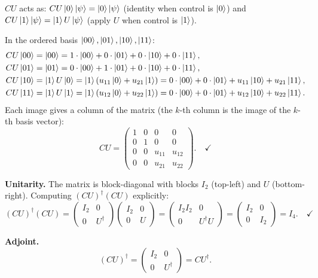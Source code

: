 \documentclass{ceri/sty/rapport}
\begin{document}
\begin{solution}
$CU$ acts as: $CU\ket{0}\ket{\psi}=\ket{0}\ket{\psi}$ (identity when control is $\ket{0}$) and
$CU\ket{1}\ket{\psi}=\ket{1}U\ket{\psi}$ (apply $U$ when control is $\ket{1}$).

In the ordered basis $\ket{00},\ket{01},\ket{10},\ket{11}$:
\begin{align*}
  CU\ket{00}&=\ket{00}
             =1\cdot\ket{00}+0\cdot\ket{01}+0\cdot\ket{10}+0\cdot\ket{11},\\
  CU\ket{01}&=\ket{01}
             =0\cdot\ket{00}+1\cdot\ket{01}+0\cdot\ket{10}+0\cdot\ket{11},\\
  CU\ket{10}&=\ket{1}U\ket{0}
             =\ket{1}(u_{11}\ket{0}+u_{21}\ket{1})
             =0\cdot\ket{00}+0\cdot\ket{01}+u_{11}\ket{10}+u_{21}\ket{11},\\
  CU\ket{11}&=\ket{1}U\ket{1}
             =\ket{1}(u_{12}\ket{0}+u_{22}\ket{1})
             =0\cdot\ket{00}+0\cdot\ket{01}+u_{12}\ket{10}+u_{22}\ket{11}.
\end{align*}
Each image gives a column of the matrix (the $k$-th column is the image of the $k$-th basis vector):
\[
  CU =
  \begin{pmatrix}
    1 & 0 & 0      & 0      \\
    0 & 1 & 0      & 0      \\
    0 & 0 & u_{11} & u_{12} \\
    0 & 0 & u_{21} & u_{22}
  \end{pmatrix}.\quad\checkmark
\]

\medskip\noindent
\textbf{Unitarity.}
The matrix is block-diagonal with blocks $I_2$ (top-left) and $U$ (bottom-right).
Computing $(CU)^\dagger(CU)$ explicitly:
\[
  (CU)^\dagger(CU)
  =\begin{pmatrix}I_2 & 0 \\ 0 & U^\dagger\end{pmatrix}
   \begin{pmatrix}I_2 & 0 \\ 0 & U\end{pmatrix}
  =\begin{pmatrix}I_2 I_2 & 0 \\ 0 & U^\dagger U\end{pmatrix}
  =\begin{pmatrix}I_2 & 0 \\ 0 & I_2\end{pmatrix}
  = I_4.\quad\checkmark
\]

\medskip\noindent
\textbf{Adjoint.}
\[
  (CU)^\dagger
  =\begin{pmatrix}I_2 & 0 \\ 0 & U^\dagger\end{pmatrix}
  = CU^\dagger.
\]
\end{solution}
\end{document}
